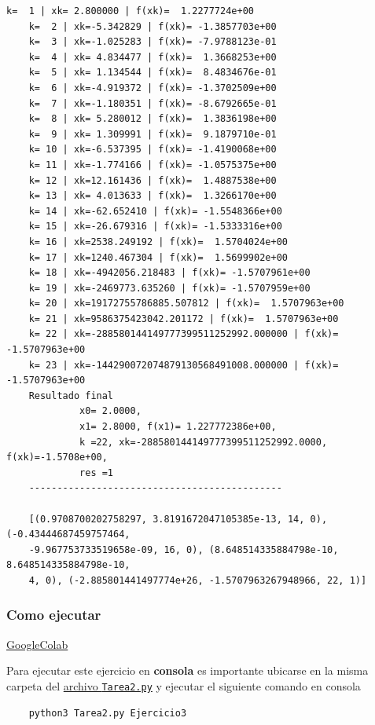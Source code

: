 \documentclass[11pt]{article}
\begin{document}
\begin{multicols}{2}
\begin{Verbatim}[commandchars=\\\{\}]
	k=  1 | xk= 2.800000 | f(xk)=  1.2277724e+00
	k=  2 | xk=-5.342829 | f(xk)= -1.3857703e+00
	k=  3 | xk=-1.025283 | f(xk)= -7.9788123e-01
	k=  4 | xk= 4.834477 | f(xk)=  1.3668253e+00
	k=  5 | xk= 1.134544 | f(xk)=  8.4834676e-01
	k=  6 | xk=-4.919372 | f(xk)= -1.3702509e+00
	k=  7 | xk=-1.180351 | f(xk)= -8.6792665e-01
	k=  8 | xk= 5.280012 | f(xk)=  1.3836198e+00
	k=  9 | xk= 1.309991 | f(xk)=  9.1879710e-01
	k= 10 | xk=-6.537395 | f(xk)= -1.4190068e+00
	k= 11 | xk=-1.774166 | f(xk)= -1.0575375e+00
	k= 12 | xk=12.161436 | f(xk)=  1.4887538e+00
	k= 13 | xk= 4.013633 | f(xk)=  1.3266170e+00
	k= 14 | xk=-62.652410 | f(xk)= -1.5548366e+00
	k= 15 | xk=-26.679316 | f(xk)= -1.5333316e+00
	k= 16 | xk=2538.249192 | f(xk)=  1.5704024e+00
	k= 17 | xk=1240.467304 | f(xk)=  1.5699902e+00
	k= 18 | xk=-4942056.218483 | f(xk)= -1.5707961e+00
	k= 19 | xk=-2469773.635260 | f(xk)= -1.5707959e+00
	k= 20 | xk=19172755786885.507812 | f(xk)=  1.5707963e+00
	k= 21 | xk=9586375423042.201172 | f(xk)=  1.5707963e+00
	k= 22 | xk=-288580144149777399511252992.000000 | f(xk)= -1.5707963e+00
	k= 23 | xk=-144290072074879130568491008.000000 | f(xk)= -1.5707963e+00
	Resultado final
		     x0= 2.0000,
		     x1= 2.8000, f(x1)= 1.227772386e+00,
		     k =22, xk=-288580144149777399511252992.0000, f(xk)=-1.5708e+00,
		     res =1
	---------------------------------------------

	[(0.9708700202758297, 3.8191672047105385e-13, 14, 0), (-0.43444687459757464,
	-9.967753733519658e-09, 16, 0), (8.648514335884798e-10, 8.648514335884798e-10,
	4, 0), (-2.885801441497774e+26, -1.5707963267948966, 22, 1)]
		\end{Verbatim}
\end{multicols}
		\hypertarget{como-ejecutar}{%
	\subsubsection{Como ejecutar}\label{como-ejecutar}}

		\href{https://colab.research.google.com/gist/BenchHPZ/.../---.ipynb}{GoogleColab}

	Para ejecutar este ejercicio en \textbf{consola} es importante ubicarse
	en la misma carpeta del
	\href{https://github.com/BenchHPZ/UG-Compu/blob/master/MN/Tareas/T2/Tarea2.py}{archivo
	\texttt{Tarea2.py}} y ejecutar el siguiente comando en consola

	\begin{verbatim}
	python3 Tarea2.py Ejercicio3
	\end{verbatim}
\end{document}
